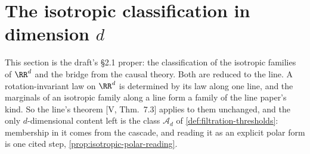 \section{The isotropic classification in dimension $d$}
\label{sec:isotropic-classification}

This section is the draft's \S 2.1 proper: the classification of the isotropic families of
$\RR^d$ and the bridge from the causal theory. Both are reduced to the line. A
rotation-invariant law on $\RR^d$ is determined by its law along one line, and the marginals of
an isotropic family along a line form a family of the line paper's kind. So the line's theorem
[V, Thm.~7.3] applies to them unchanged, and the only $d$-dimensional content left is the class
$\mathcal{A}_d$ of \ref{def:filtration-thresholds}: membership in it comes from the cascade, and
reading it as an explicit polar form is one cited step, \ref{prop:isotropic-polar-reading}.


